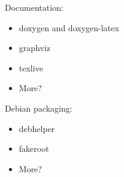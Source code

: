    Documentation:

     \begin{itemize}
        \item doxygen and doxygen-latex
        \item graphviz
        \item texlive
        \item More?
     \end{itemize}
      
   Debian packaging:

     \begin{itemize}
        \item debhelper
        \item fakeroot
        \item More?
     \end{itemize}

